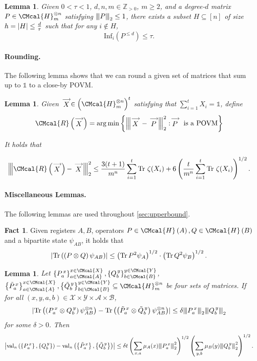 \documentclass[10pt,a4paper]{article}
\def\A{\CMcal{A}}
\def\B{\CMcal{B}}
\def\H{\CMcal{H}}
\def\R{\CMcal{R}}
\def\X{\CMcal{X}}
\def\Y{\CMcal{Y}}
\theoremstyle{plain}
\newtheorem{lemma}[theorem]{Lemma}
\theoremstyle{definition}
\newtheorem{fact}[theorem]{Fact}
\newcommand {\set} [1] {\ensuremath{ \left\lbrace #1 \right\rbrace }}
\newcommand {\br} [1] {\ensuremath{ \left( #1 \right) }}
\newcommand {\ab} [1] {\ensuremath{ \left| #1 \right| }}
\DeclarePairedDelimiter{\abs}{\lvert}{\rvert}
\newcommand{\nnorm}[1]{{\left\vert\kern-0.25ex\left\vert\kern-0.25ex\left\vert #1
		\right\vert\kern-0.25ex\right\vert\kern-0.25ex\right\vert}}
\newcommand {\Tr} {\ensuremath{ \mathrm{Tr} }}
\newcommand {\id} {\ensuremath{\mathds{1}}}
\renewcommand{\vec}[1]{\stackrel{\longrightarrow}{#1}}
\newcommand{\posint}{{\mathbb Z}_{>0}}
\newcommand{\herspace}[1]{\ensuremath{\H_m^{\otimes #1}}}
\newcommand{\infi}[1]{\ensuremath{\mathrm{Inf}_i}\br{#1}}
\newcommand{\gval}[3]{\ensuremath{\mathrm{val}_{#1}\br{\set{#2},\set{#3}}}}
\newcommand{\fourtuples}{\ensuremath{\br{x,y,a,b}\in\calX\times\calY\times\calA\times\calB}}
\newcommand{\Pss} {\ensuremath{P^{\,x}_a}}
\newcommand{\Qss} {\ensuremath{Q^{\,y}_b}}
\newcommand{\Pwss} {\ensuremath{\tilde{P}^{\,x}_a}}
\newcommand{\Qwss} {\ensuremath{\tilde{Q}^{\,y}_b}}
\newcommand{\calX}{\mathcal{X}}
\newcommand{\calY}{\mathcal{Y}}
\newcommand{\calA}{\mathcal{A}}
\newcommand{\calB}{\mathcal{B}}
\newcommand{\1}{\mathbb{1}} %
\begin{document}
\begin{lemma}\label{lem:regular}\cite[Lemma 7.4]{qin2021nonlocal}
	Given $0<\tau<1$, $d,n,m\in\posint$, $m\geq2$, and a degree-$d$ matrix $P\in\H_m^{\otimes n}$ satisfying $\nnorm{P}_2\leq1$, there exists a subset $H\subseteq[n]$ of size $h=\abs{H}\leq\frac{d}{\tau}$ such that for any $i\notin H$,
$$\infi{P^{\leq d}}\leq\tau.$$ 
\end{lemma}



\paragraph*{Rounding.} The following lemma shows that we can round a given set of matrices that sum up to $\id$
to a close-by POVM.
\begin{lemma}\label{lem:closedelta}
	Given $\vec{X}\in\br{\H_m^{\otimes n}}^t$ satisfying that $\sum_{i=1}^tX_i=\id$, define
	$$\R\br{\vec{X}}=\arg\min\set{\nnorm{\vec{X}-\vec{P}}_2^2:\vec{P}~\mbox{is a POVM}}$$
	
	It holds that
	
	$$\nnorm{\R\br{\vec{X}}-\vec{X}}_2^2\leq\frac{3(t+1)}{m^n}\sum_{i=1}^t\Tr~\zeta(X_i)+6\br{\frac{t}{m^n}\sum_{i=1}^t\Tr~\zeta(X_i)}^{1/2}.$$
\end{lemma}

\paragraph*{Miscellaneous Lemmas.} The following lemmas are used throughout \cref{sec:upperbound}.

	\begin{fact}\label{fac:cauchyschwartz}\cite[Fact 2.1]{qin2021nonlocal}
		Given registers $A, B$, operators $P\in\H\br{A}, Q\in\H\br{B}$ and a bipartite state $\psi_{AB}$, it holds that
		\[\abs{\Tr\br{\br{P\otimes Q}\psi_{AB}}}\leq\br{\Tr \,P^2\psi_A}^{1/2}\cdot\br{\Tr \,Q^2\psi_B}^{1/2}.\]
	\end{fact}

\begin{lemma}\label{lem:maincauchy}
Let $\set{\Pss}^{x\in\X}_{a\in\A},\set{\Qss}^{y\in\Y}_{b\in\B}$, $\set{\Pwss}^{x\in\X}_{a\in\A},\set{\Qwss}^{y\in\Y}_{b\in\B}\subseteq\herspace{n}$ be four sets of matrices. If for all \fourtuples, 
\[\abs{\Tr\br{\br{\Pss\otimes \Qss}\psi_{AB}^{\otimes n}}-\Tr\br{\br{\Pwss\otimes \Qwss}\psi_{AB}^{\otimes n}}}\leq\delta\nnorm{\Pss}_2\nnorm{\Qss}_2\]
for some $\delta>0$. 
Then
\[\ab{\gval{n}{\Pss}{\Qss}-\gval{n}{\Pwss}{\Qwss}}\leq\delta t\br{\sum_{x,a}\mu_A(x)\nnorm{\Pss}_2^2}^{1/2}\br{\sum_{y,b}\mu_B(y)\nnorm{\Qss}_2^2}^{1/2}.\]
\end{lemma}
\end{document}
